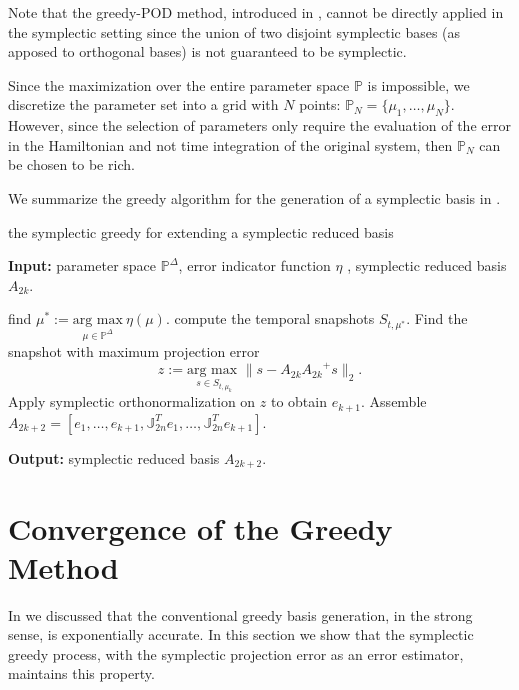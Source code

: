 Note that the greedy-POD method, introduced in , cannot be directly applied in the symplectic setting since the union of two disjoint symplectic bases (as apposed to orthogonal bases) is not guaranteed to be symplectic.

Since the maximization over the entire parameter space $\mathbb P$ is impossible, we discretize the parameter set into a grid with $N$ points: $\mathbb P_N = \{ \mu_1,\dots,\mu_N\}$. However, since the selection of parameters only require the evaluation of the error in the Hamiltonian and not time integration of the original system, then $\mathbb P_N$ can be chosen to be rich. 

We summarize the greedy algorithm for the generation of a symplectic basis in .

\begin{algorithm} 
	\caption{the symplectic greedy for extending a symplectic reduced basis} \label{alg:4.1}
	\textbf{Input:} parameter space $\mathbb P^{\Delta}$, error indicator function $\eta$ , symplectic reduced basis $A_{2k}$.
	\begin{algorithmic} [1]
		\State find $\mu^* := \underset{\mu \in \mathbb P^{\Delta}}{\text{arg\ max}} \ \eta(\mu)$.
		\State compute the temporal snapshots $S_{t,\mu^*}$.
		\State Find the snapshot with maximum projection error
		\[
			z := \underset{s\in S_{t,\mu_{k}}}{\text{arg\ max }} \| s - A_{2k}{A_{2k}}^+s \|_2.
		\]
		\State Apply symplectic orthonormalization on $z$ to obtain $e_{k+1}$.
		\State Assemble $A_{2k+2} = [e_1,\dots,e_{k+1},\mathbb J_{2n}^T e_1,\dots,\mathbb J_{2n}^T e_{k+1} ]$.
	\end{algorithmic}
	\vspace{0.5cm}
	\textbf{Output:} symplectic reduced basis $A_{2k+2}$.
\end{algorithm}


\section{Convergence of the Greedy Method} \label{p1.sec:SyMo.PrSy:4}

In  we discussed that the conventional greedy basis generation, in the strong sense, is exponentially accurate. In this section we show that the symplectic greedy process, with the symplectic projection error as an error estimator, maintains this property.

